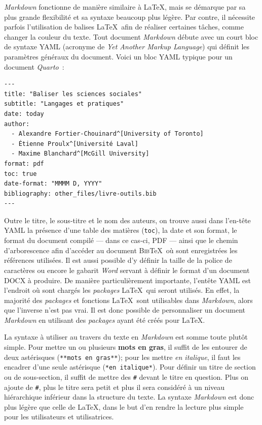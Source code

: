 \documentclass[
  letterpaper,
  DIV=11,
  numbers=noendperiod,
  oneside]{scrreprt}
\begin{document}
\emph{Markdown} fonctionne de manière similaire à \LaTeX{}, mais se
démarque par sa plus grande flexibilité et sa syntaxe beaucoup plus
légère. Par contre, il nécessite parfois l'utilisation de balises
\LaTeX{}~afin de réaliser certaines tâches, comme changer la couleur du
texte. Tout document \emph{Markdown} débute avec un court bloc de
syntaxe YAML (acronyme de \emph{Yet Another Markup Language}) qui
définit les paramètres généraux du document. Voici un bloc YAML typique
pour un document \emph{Quarto}~:

\begin{verbatim}
---
title: "Baliser les sciences sociales"
subtitle: "Langages et pratiques"
date: today
author:
  - Alexandre Fortier-Chouinard^[University of Toronto]
  - Étienne Proulx^[Université Laval]
  - Maxime Blanchard^[McGill University]
format: pdf
toc: true
date-format: "MMMM D, YYYY"
bibliography: other_files/livre-outils.bib
---
\end{verbatim}

Outre le titre, le sous-titre et le nom des auteurs, on trouve aussi
dans l'en-tête YAML la présence d'une table des matières (\texttt{toc}),
la date et son format, le format du document compilé --- dans ce cas-ci,
PDF --- ainsi que le chemin d'arborescence afin d'accéder au document
\textsc{Bib}\TeX~où sont enregistrées les références utilisées. Il est
aussi possible d'y définir la taille de la police de caractères ou
encore le gabarit \emph{Word} servant à définir le format d'un document
DOCX à produire. De manière particulièrement importante, l'entête YAML
est l'endroit où sont chargés les \emph{packages} \LaTeX{}~qui seront
utilisés. En effet, la majorité des \emph{packages} et fonctions
\LaTeX{}~sont utilisables dans \emph{Markdown}, alors que l'inverse
n'est pas vrai. Il est donc possible de personnaliser un document
\emph{Markdown} en utilisant des \emph{packages} ayant été créés pour
\LaTeX{}.

La syntaxe à utiliser au travers du texte en \emph{Markdown} est somme
toute plutôt simple. Pour mettre un ou plusieurs \textbf{mots en gras},
il suffit de les entourer de deux astérisques
(\texttt{**mots\ en\ gras**}); pour les mettre \emph{en italique}, il
faut les encadrer d'une seule astérisque (\texttt{*en\ italique*}). Pour
définir un titre de section ou de sous-section, il suffit de mettre des
\texttt{\#} devant le titre en question. Plus on ajoute de \texttt{\#},
plus le titre sera petit et plus il sera considéré à un niveau
hiérarchique inférieur dans la structure du texte. La syntaxe
\emph{Markdown} est donc plus légère que celle de \LaTeX{}, dans le but
d'en rendre la lecture plus simple pour les utilisateurs et
utilisatrices.
\end{document}
